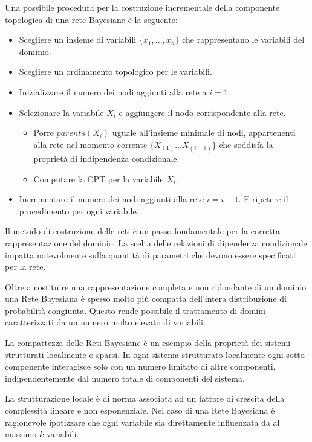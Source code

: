 Una possibile procedura per la costruzione incrementale della componente topologica
di una rete Bayesiane è la seguente:
\begin{itemize}
    \item Scegliere un insieme di variabili $\{x_1, \dots, x_n\}$ che rappresentano
          le variabili del dominio.
    \item Scegliere un ordinamento topologico per le variabili.
    \item Inizializzare il numero dei nodi aggiunti alla rete a $i = 1$.
    \item Selezionare la variabile $X_i$ e aggiungere il nodo corrispondente alla
          rete.
          \begin{itemize}
              \item Porre $parents(X_i)$ uguale all'insieme minimale di nodi,
                    appartenenti alla rete nel momento corrente $\{X_{(1)} \dots X_{(i-1)}\}$
                    che soddisfa la proprietà di indipendenza condizionale.
              \item Computare la CPT per la variabile $X_i$.
          \end{itemize}
    \item Incrementare il numero dei nodi aggiunti alla rete $i=i+1$. E ripetere il
          procedimento per ogni variabile.
\end{itemize}
Il metodo di costruzione delle reti è un passo fondamentale per la corretta
rappresentazione del dominio. La scelta delle relazioni di dipendenza condizionale
impatta notevolmente sulla quantità di parametri che devono essere specificati
per la rete.

Oltre a costituire una rappresentazione completa e non ridondante di un dominio
una Rete Bayesiana è spesso molto più compatta dell'intera distribuzione di
probabilità congiunta. Questo rende possibile il trattamento di domini
caratterizzati da un numero molto elevato di variabili.

La compattezza delle Reti Bayesiane è un esempio della proprietà dei sistemi
strutturati localmente o sparsi. In ogni sistema strutturato localmente ogni
sotto-componente interagisce solo con un numero limitato di altre componenti,
indipendentemente dal numero totale di componenti del sistema.

La strutturazione locale è di norma associata ad un fattore di crescita della
complessità lineare e non esponenziale. Nel caso di una Rete Bayesiana è 
ragionevole ipotizzare che ogni variabile sia direttamente influenzata da al 
massimo $k$ variabili.

